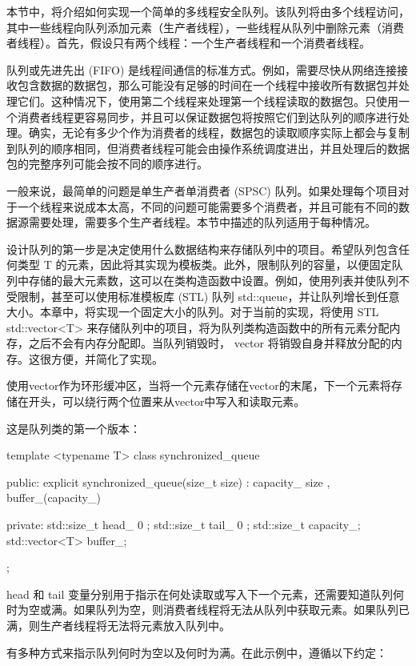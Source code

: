 本节中，将介绍如何实现一个简单的多线程安全队列。该队列将由多个线程访问，其中一些线程向队列添加元素（生产者线程），一些线程从队列中删除元素（消费者线程）。首先，假设只有两个线程：一个生产者线程和一个消费者线程。

队列或先进先出 (FIFO) 是线程间通信的标准方式。例如，需要尽快从网络连接接收包含数据的数据包，那么可能没有足够的时间在一个线程中接收所有数据包并处理它们。这种情况下，使用第二个线程来处理第一个线程读取的数据包。只使用一个消费者线程更容易同步，并且可以保证数据包将按照它们到达队列的顺序进行处理。确实，无论有多少个作为消费者的线程，数据包的读取顺序实际上都会与复制到队列的顺序相同，但消费者线程可能会由操作系统调度进出，并且处理后的数据包的完整序列可能会按不同的顺序进行。

一般来说，最简单的问题是单生产者单消费者 (SPSC) 队列。如果处理每个项目对于一个线程来说成本太高，不同的问题可能需要多个消费者，并且可能有不同的数据源需要处理，需要多个生产者线程。本节中描述的队列适用于每种情况。

设计队列的第一步是决定使用什么数据结构来存储队列中的项目。希望队列包含任何类型 T 的元素，因此将其实现为模板类。此外，限制队列的容量，以便固定队列中存储的最大元素数，这可以在类构造函数中设置。例如，使用列表并使队列不受限制，甚至可以使用标准模板库 (STL) 队列 std::queue，并让队列增长到任意大小。本章中，将实现一个固定大小的队列。对于当前的实现，将使用 STL std::vector<T> 来存储队列中的项目，将为队列类构造函数中的所有元素分配内存，之后不会有内存分配即。当队列销毁时， vector 将销毁自身并释放分配的内存。这很方便，并简化了实现。

使用vector作为环形缓冲区，当将一个元素存储在vector的末尾，下一个元素将存储在开头，可以绕行两个位置来从vector中写入和读取元素。

这是队列类的第一个版本：

\begin{cpp}
template <typename T>
class synchronized_queue {
public:
    explicit synchronized_queue(size_t size) :
        capacity_{ size }, buffer_(capacity_)
        {}

private:
    std::size_t head_{ 0 };
    std::size_t tail_{ 0 };
    std::size_t capacity_;
    std::vector<T> buffer_;
};
\end{cpp}

head 和 tail 变量分别用于指示在何处读取或写入下一个元素，还需要知道队列何时为空或满。如果队列为空，则消费者线程将无法从队列中获取元素。如果队列已满，则生产者线程将无法将元素放入队列中。

有多种方式来指示队列何时为空以及何时为满。在此示例中，遵循以下约定：

